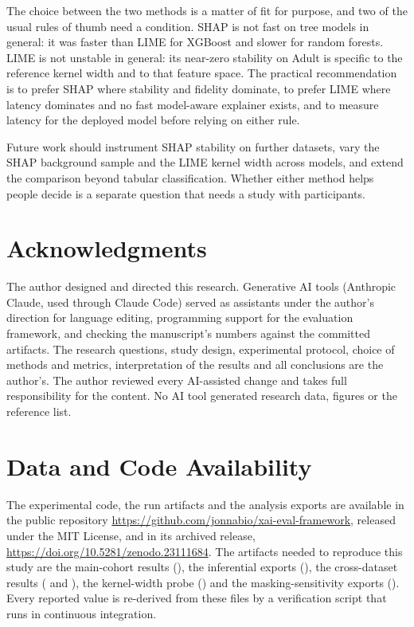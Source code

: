 \documentclass{cleiej}
\newcommand{\zenodoversiondoi}{\url{https://doi.org/10.5281/zenodo.23111684}}
\begin{document}
The choice between the two methods is a matter of fit for purpose, and two
of the usual rules of thumb need a condition. SHAP is not fast on tree
models in general: it was faster than LIME for XGBoost and slower for
random forests. LIME is not unstable in general: its near-zero stability on
Adult is specific to the reference kernel width and to that feature space.
The practical recommendation is to prefer SHAP where stability and fidelity
dominate, to prefer LIME where latency dominates and no fast model-aware
explainer exists, and to measure latency for the deployed model before
relying on either rule.

Future work should instrument SHAP stability on further datasets, vary the
SHAP background sample and the LIME kernel width across models, and extend
the comparison beyond tabular classification. Whether either method helps
people decide is a separate question that needs a study with participants.

\section*{Acknowledgments}

The author designed and directed this research. Generative AI tools
(Anthropic Claude, used through Claude Code) served as assistants under the
author's direction for language editing, programming support for the
evaluation framework, and checking the manuscript's numbers against the
committed artifacts. The research questions, study design, experimental
protocol, choice of methods and metrics, interpretation of the results and
all conclusions are the author's. The author reviewed every AI-assisted
change and takes full responsibility for the content. No AI tool generated
research data, figures or the reference list.

\section*{Data and Code Availability}
\label{sec:artifacts}

The experimental code, the run artifacts and the analysis exports are
available in the public repository
\url{https://github.com/jonnabio/xai-eval-framework}, released under the
MIT License, and in its archived release, \zenodoversiondoi{}. The
artifacts needed to reproduce this study are the main-cohort results
(), the inferential exports
(), the cross-dataset results
( and
), the kernel-width probe
() and the
masking-sensitivity exports
(). Every reported value
is re-derived from these files by a verification script that runs in
continuous integration.
\end{document}
